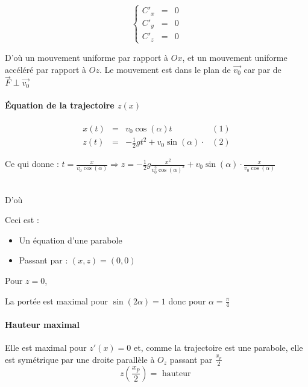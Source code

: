 		\[\left\{\begin{array}{rcl}
			C'_x &=& 0 \\
			C'_y &=& 0 \\
			C'_z &=& 0 \end{array}\right.\]

D'où un mouvement uniforme par rapport à $Ox$, et un mouvement uniforme accéléré par rapport à $Oz$.
Le mouvement est dans le plan de $\vec{v_0}$ car par de $\vec{F} \perp  \vec{v_0}$

\paragraph{Équation de la trajectoire $z(x)$ }

\[\begin{array}{rclr}
		x(t) &=& v_0 \cos(\alpha) t & (1) \\
z(t) &=& -\frac{1}{2}gt^2 + v_0 \sin(\alpha)\cdot & (2)\end{array}\]
	
	Ce qui donne : $t = \frac{x}{v_0\cos(\alpha)} \Rightarrow z=-\frac{1}{2}g\frac{x^2}{v_0^2\cos(\alpha)^2} + v_0 \sin(\alpha) \cdot \frac{x}{v_0\cos(\alpha)}$ ~\\ ~\\
\begin{center} D'où \end{center}

	Ceci est : \begin{itemize}
		\item Un équation d'une parabole 
		\item Passant par : $(x,z) = (0, 0)$
	\end{itemize}
	
	\begin{center} Pour $z=0$, \end{center}

	La portée est maximal pour $\sin(2\alpha) = 1$ donc pour $\alpha = \frac{\pi}{4}$

	\paragraph{Hauteur maximal}
	Elle est maximal pour $z'(x) = 0$ et, comme la trajectoire est une parabole, elle est symétrique par une droite parallèle à $O_z$ passant par $\frac{x_p}{2}$
	\[z(\frac{x_p}{2}) = \text{ hauteur }\] 

